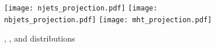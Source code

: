 \begin{figure}[htbp]
\begin{center}
\texttt{[image: njets\_projection.pdf]} 
\texttt{[image: nbjets\_projection.pdf]}  
\texttt{[image: mht\_projection.pdf]} 
\caption{\njets, \nbjets, and \MHT distributions} 
\end{center} 
\end{figure} 

